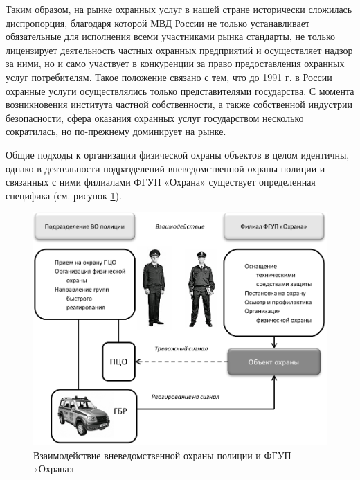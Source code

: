 \documentclass[a4paper,12pt,fleqn]{article} %
\begin{document}
Таким образом, на рынке охранных услуг в нашей стране исторически сложилась диспропорция, благодаря которой МВД России не только устанавливает обязательные для исполнения всеми участниками рынка стандарты, не только лицензирует деятельность частных охранных предприятий и осуществляет надзор за ними, но и само участвует в конкуренции за право предоставления охранных услуг потребителям. Такое положение связано с тем, что до 1991 г. в России охранные услуги осуществлялись только представителями государства. С момента возникновения института частной собственности, а также собственной индустрии безопасности, сфера оказания охранных услуг государством несколько сократилась, но по-прежнему доминирует на рынке.

Общие подходы к организации физической охраны объектов в целом идентичны, однако в деятельности подразделений вневедомственной охраны полиции и связанных с ними филиалами ФГУП «Охрана» существует определенная специфика (см. рисунок \ref{image7}).

\begin{figure}[h]
	\centering
	\includegraphics[scale=0.7]{img7}
	\caption{Взаимодействие вневедомственной охраны полиции и ФГУП «Охрана»}
	\label{image7}
\end{figure}
\end{document}
